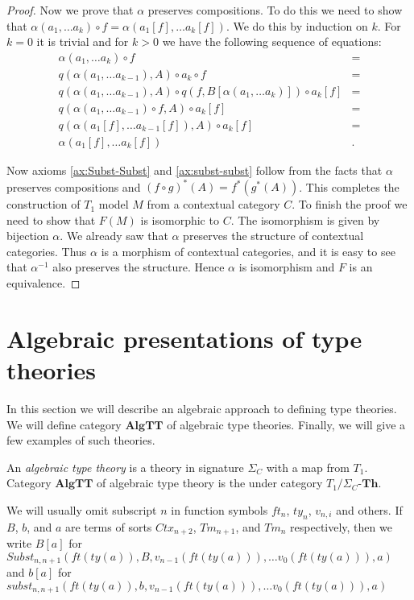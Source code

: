 \documentclass{amsart}
\theoremstyle{definition}
\theoremstyle{remark}
\newcommand{\cat}[1]{\mathbf{#1}}
\newcommand{\algtt}{\cat{AlgTT}}
\numberwithin{figure}{section}
\begin{document}
\begin{proof}
Now we prove that $\alpha$ preserves compositions.
To do this we need to show that $\alpha(a_1, \ldots a_k) \circ f = \alpha(a_1[f], \ldots a_k[f])$.
We do this by induction on $k$.
For $k = 0$ it is trivial and for $k > 0$ we have the following sequence of equations:
\begin{align*}
\alpha(a_1, \ldots a_k) \circ f & = \\
q(\alpha(a_1, \ldots a_{k-1}), A) \circ a_k \circ f & = \\
q(\alpha(a_1, \ldots a_{k-1}), A) \circ q(f, B[\alpha(a_1, \ldots a_k)]) \circ a_k[f] & = \\
q(\alpha(a_1, \ldots a_{k-1}) \circ f, A) \circ a_k[f] & = \\
q(\alpha(a_1[f], \ldots a_{k-1}[f]), A) \circ a_k[f] & = \\
\alpha(a_1[f], \ldots a_k[f]) & .
\end{align*}

Now axioms \eqref{ax:Subst-Subst} and \eqref{ax:subst-subst} follow from the facts that $\alpha$ preserves compositions and $(f \circ g)^*(A) = f^*(g^*(A))$.
This completes the construction of $T_1$ model $M$ from a contextual category $C$.
To finish the proof we need to show that $F(M)$ is isomorphic to $C$.
The isomorphism is given by bijection $\alpha$.
We already saw that $\alpha$ preserves the structure of contextual categories.
Thus $\alpha$ is a morphism of contextual categories, and it is easy to see that $\alpha^{-1}$ also preserves the structure.
Hence $\alpha$ is isomorphism and $F$ is an equivalence.
\end{proof}

\section{Algebraic presentations of type theories}

In this section we will describe an algebraic approach to defining type theories.
We will define category $\algtt$ of algebraic type theories.
Finally, we will give a few examples of such theories.

\begin{defn}
An \emph{algebraic type theory} is a theory in signature $\Sigma_C$ with a map from $T_1$.
Category $\algtt$ of algebraic type theory is the under category $T_1 / \Sigma_C \text{-} \cat{Th}$.
\end{defn}

We will usually omit subscript $n$ in function symbols $ft_n$, $ty_n$, $v_{n,i}$ and others.
If $B$, $b$, and $a$ are terms of sorts $Ctx_{n+2}$, $Tm_{n+1}$, and $Tm_n$ respectively, then
we write $B[a]$ for $Subst_{n,n+1}(ft(ty(a)), B, v_{n-1}(ft(ty(a))), \ldots v_0(ft(ty(a))), a)$
and $b[a]$ for $subst_{n,n+1}(ft(ty(a)), b, v_{n-1}(ft(ty(a))), \ldots v_0(ft(ty(a))), a)$
\end{document}
